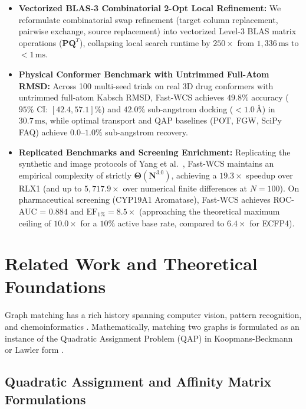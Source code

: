 \documentclass[conference]{IEEEtran}
\begin{document}
\begin{itemize}
    \item \textbf{Vectorized BLAS-3 Combinatorial 2-Opt Local Refinement:} We reformulate combinatorial swap refinement (target column replacement, pairwise exchange, source replacement) into vectorized Level-3 BLAS matrix operations ($\mathbf{P}\mathbf{Q}^T$), collapsing local search runtime by $250\times$ from $1,336\,\text{ms}$ to $< 1\,\text{ms}$.
    \item \textbf{Physical Conformer Benchmark with Untrimmed Full-Atom RMSD:} Across 100 multi-seed trials on real 3D drug conformers with untrimmed full-atom Kabsch RMSD, Fast-WCS achieves $49.8\%$ accuracy ($95\%$ CI: $[42.4, 57.1]\%$) and $\mathbf{42.0\%}$ sub-angstrom docking ($< 1.0\,\text{\AA}$) in $30.7\,\text{ms}$, while optimal transport and QAP baselines (POT, FGW, SciPy FAQ) achieve $0.0\text{--}1.0\%$ sub-angstrom recovery.
    \item \textbf{Replicated Benchmarks and Screening Enrichment:} Replicating the synthetic and image protocols of Yang et al.~\cite{yang2018algorithm}, Fast-WCS maintains an empirical complexity of strictly $\mathbf{\Theta(N^{3.0})}$, achieving a $19.3\times$ speedup over RLX1 (and up to $5,717.9\times$ over numerical finite differences at $N = 100$). On pharmaceutical screening (CYP19A1 Aromatase), Fast-WCS achieves ROC-AUC = $0.884$ and $\text{EF}_{1\%} = 8.5\times$ (approaching the theoretical maximum ceiling of $10.0\times$ for a $10\%$ active base rate, compared to $6.4\times$ for ECFP4).
\end{itemize}


\section{Related Work and Theoretical Foundations}
\label{sec:related_work}

Graph matching has a rich history spanning computer vision, pattern recognition, and chemoinformatics \cite{conte2004, emmert2007}. Mathematically, matching two graphs is formulated as an instance of the Quadratic Assignment Problem (QAP) in Koopmans-Beckmann \cite{koopmans1957} or Lawler form \cite{lawler1963}.

\subsection{Quadratic Assignment and Affinity Matrix Formulations}
\end{document}
